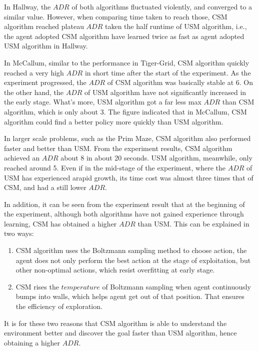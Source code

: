 \documentclass[conference]{IEEEtran}
\begin{document}
	In Hallway, the $ADR$ of both algorithms fluctuated violently,  
	and converged to a similar value. However, when comparing time taken to reach those,
	CSM algorithm reached plateau $ADR$ taken the half runtime of USM algorithm, i.e.,
	the agent adopted CSM algorithm have learned twice as fast as agent adopted USM algorithm
	in Hallway.
	
	In McCallum, similar to the performance in Tiger-Grid, CSM algorithm quickly reached
	a very high $ADR$ in short time after the start of the experiment. As the experiment
	progressed, the $ADR$ of CSM algorithm was basically stable at 6. On the other hand,
	the $ADR$ of USM algorithm have not significantly increased in the early stage. What's more,
	USM algorithm got a far less max $ADR$ than CSM algorithm, which is only about 3. The figure
	indicated that in McCallum, CSM algorithm could find a better policy more quickly than USM
	algorithm.
	
	In larger scale problems, such as the Prim Maze, CSM algorithm also performed
	faster and better than USM. From the experiment results, CSM algorithm achieved an
	$ADR$ about 8 in about 20 seconds. USM algorithm, meanwhile, only reached around 5.
	Even if in the mid-stage of the experiment, where the $ADR$ of USM has experienced arapid growth,
	its time cost was almost three times that of CSM, and had a still lower $ADR$.
	
	In addition, it can be seen from the experiment result that at the beginning of the experiment,
	although both algorithms have not gained experience through learning, CSM has obtained a higher
	$ADR$ than USM. This can be explained in two ways:
	\begin{enumerate}
		\item CSM algorithm uses the Boltzmann sampling method to choose action, the agent does
		not only perform the best action at the stage of exploitation, but  other non-optimal actions,
		which resist overfitting at early stage.
		
		\item CSM rises the $temperature$ of Boltzmann sampling when agent continuously bumps into walls,
		which helps agent get out of that position. That ensures the efficiency of exploration.
		
	\end{enumerate}
	It is for these two reasons that CSM algorithm is able to understand the environment better and
	discover the goal faster than USM algorithm, hence obtaining a higher $ADR$.
	
\end{document}
